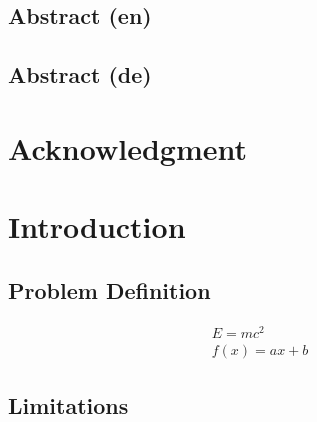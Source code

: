 \documentclass[12pt,twoside,a4paper,parskip]{scrbook} %
\begin{document}

\section*{Abstract (en)}
\lipsum[1]

\section*{Abstract (de)}
\lipsum[1]

\newpage
\chapter*{Acknowledgment}
\lipsum[1-2]

\tableofcontents



\mainmatter

\chapter{Introduction}\label{ch:intro}
\lipsum[]

\section{Problem Definition}
\lipsum[1-3]
\begin{equation}
	\begin{array}{l}
	E = mc^2\\
	f(x) = ax+b
	\end{array}
\label{equation_problem_definition}
\end{equation} 

\lipsum[1]

\section{Limitations}
\lipsum[1-2]
\end{document}
